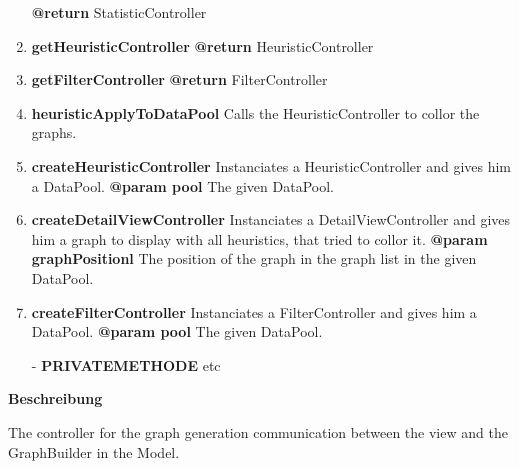 \begin{enumerate}[+]
{	\textbf{@return} StatisticController \newline
}
	\item{
	\textbf{getHeuristicController} \newline
	\textbf{@return} HeuristicController \newline
}
	\item{
	\textbf{getFilterController} \newline
	\textbf{@return} FilterController \newline
}
	\item{
	\textbf{heuristicApplyToDataPool} \newline
	Calls the HeuristicController to collor the graphs. \newline
}
	\item{
	\textbf{createHeuristicController} \newline
	Instanciates a HeuristicController and gives him a DataPool.
	\textbf{@param pool} The given DataPool. \newline
}
	\item{
	\textbf{createDetailViewController} \newline
	Instanciates a DetailViewController and gives him a graph to display with all heuristics, that tried to collor it.
	\textbf{@param graphPositionl} The position of the graph in the graph list in the given DataPool. \newline
}
	\item{
	\textbf{createFilterController} \newline
	Instanciates a FilterController and gives him a DataPool.
	\textbf{@param pool} The given DataPool. \newline
}

	\item[-]{
		\textbf{PRIVATEMETHODE} etc
	}
\end{enumerate}

\textbf{Beschreibung}

The controller for the graph generation communication between the view and the GraphBuilder in the Model.

